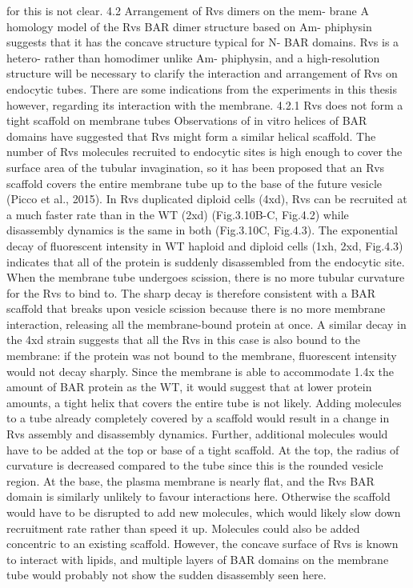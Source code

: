 \documentclass[9pt,lineno]{elife}
\begin{document}
for this is not clear.
4.2 Arrangement of Rvs dimers on the mem- brane
A homology model of the Rvs BAR dimer structure based on Am- phiphysin suggests that it has the concave structure typical for N- BAR domains. Rvs is a hetero- rather than homodimer unlike Am- phiphysin, and a high-resolution structure will be necessary to clarify the interaction and arrangement of Rvs on endocytic tubes. There are some indications from the experiments in this thesis however, regarding its interaction with the membrane.
4.2.1 Rvs does not form a tight scaffold on membrane tubes
Observations of in vitro helices of BAR domains have suggested that Rvs might form a similar helical scaffold. The number of Rvs molecules recruited to endocytic sites is high enough to cover the surface area of the tubular invagination, so it has been proposed that an Rvs scaffold covers the entire membrane tube up to the base of the future vesicle (Picco et al., 2015).
In Rvs duplicated diploid cells (4xd), Rvs can be recruited at a much faster rate than in the WT (2xd) (Fig.3.10B-C, Fig.4.2) while disassembly dynamics is the same in both (Fig.3.10C, Fig.4.3). The exponential decay of fluorescent intensity in WT haploid and diploid cells (1xh, 2xd, Fig.4.3) indicates that all of the protein is suddenly disassembled from the endocytic site. When the membrane tube undergoes scission, there is no more tubular curvature for the Rvs to bind to. The sharp decay is therefore consistent with a BAR scaffold that breaks upon vesicle scission because there is no more membrane interaction, releasing all the membrane-bound protein at once. A similar decay in the 4xd strain suggests that all the Rvs in this case is also bound to the membrane: if the protein was not bound to the membrane, fluorescent intensity would not decay sharply. Since the membrane is able to accommodate 1.4x the amount of BAR protein as the WT, it would suggest that at lower protein amounts, a tight helix that covers the entire tube is not likely. Adding molecules to a tube already completely covered by a scaffold would result in a change in Rvs assembly and disassembly dynamics.
Further, additional molecules would have to be added at the top or base of a tight scaffold. At the top, the radius of curvature is decreased compared to the tube since this is the rounded vesicle region. At the base, the plasma membrane is nearly flat, and the Rvs BAR domain is similarly unlikely to favour interactions here. Otherwise the scaffold would have to be disrupted to add new molecules, which would likely slow down recruitment rate rather than speed it up. Molecules could also be added concentric to an existing scaffold. However, the concave surface of Rvs is known to interact with lipids, and multiple layers of BAR domains on the membrane tube would probably not show the sudden disassembly seen here.
\end{document}
